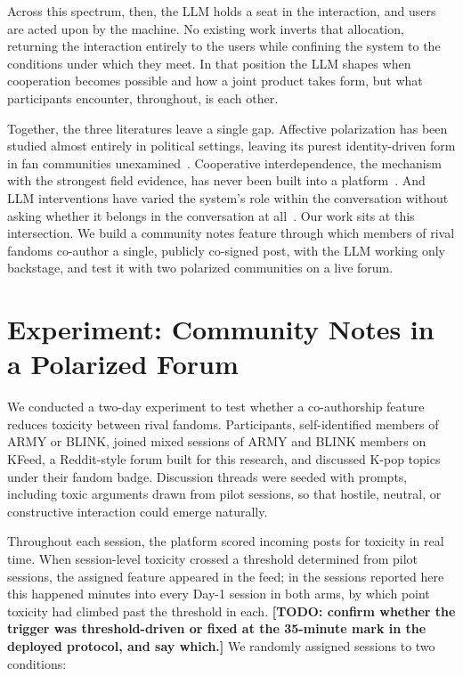 \documentclass[manuscript,screen,review,anonymous]{acmart}
\newcommand{\todonote}[1]{\textcolor{orange!80!black}{\textbf{[TODO: #1]}}}
\begin{document}
Across this spectrum, then, the LLM holds a seat in the interaction, and
users are acted upon by the machine. No existing work inverts that
allocation, returning the interaction entirely to the users while confining
the system to the conditions under which they meet. In that position the LLM
shapes when cooperation becomes possible and how a joint product takes form,
but what participants encounter, throughout, is each other.

Together, the three literatures leave a single gap. Affective polarization
has been studied almost entirely in political settings, leaving its purest
identity-driven form in fan communities unexamined~\cite{fiesler2016,
duffett2013}. Cooperative interdependence, the mechanism with the strongest
field evidence, has never been built into a platform~\cite{sherif1954,
mousa2020}. And LLM interventions have varied the system's role within the
conversation without asking whether it belongs in the conversation at
all~\cite{argyle2023, tessler2024}. Our work sits at this intersection. We
build a community notes feature through which members of rival fandoms
co-author a single, publicly co-signed post, with the LLM working only
backstage, and test it with two polarized communities on a live forum.

\section{Experiment: Community Notes in a Polarized Forum}

We conducted a two-day experiment to test whether a co-authorship feature
reduces toxicity between rival fandoms. Participants, self-identified members
of ARMY or BLINK, joined mixed sessions of ARMY and BLINK members on KFeed, a
Reddit-style forum built for this research, and discussed K-pop topics under
their fandom badge. Discussion threads were seeded with prompts, including
toxic arguments drawn from pilot sessions, so that hostile, neutral, or
constructive interaction could emerge naturally.

Throughout each session, the platform scored incoming posts for toxicity in
real time. When session-level toxicity crossed a threshold determined from
pilot sessions, the assigned feature appeared in the feed; in the sessions
reported here this happened \StatnoteOnsetMin{} minutes into every Day-1
session in both arms, by which point toxicity had climbed past the threshold
in each. \todonote{confirm whether the trigger was threshold-driven or fixed
at the 35-minute mark in the deployed protocol, and say which.} We randomly
assigned sessions to two conditions:
\end{document}
